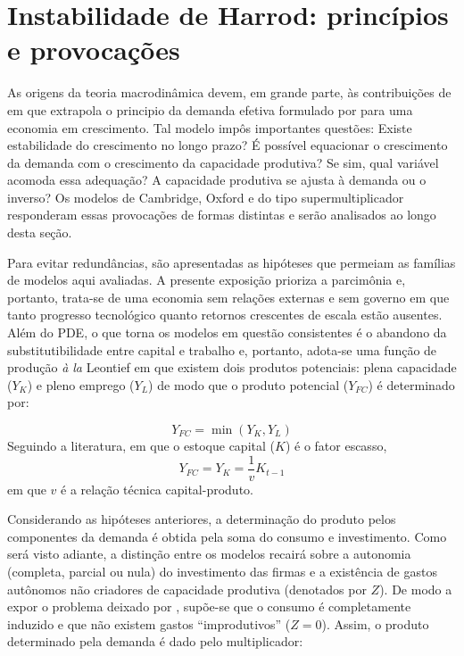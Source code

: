 
\section{Instabilidade de Harrod: princípios e provocações}\label{SecHarrod}

As origens da teoria macrodinâmica devem, em grande parte, às contribuições de \textcite{harrod_essay_1939} em que extrapola o principio da demanda efetiva formulado por \textcite{keynes_general_1936} para uma economia em crescimento. Tal modelo impôs importantes questões: Existe estabilidade do crescimento no longo pra\-zo? É possível equacionar o crescimento da demanda com o crescimento da capacidade produtiva? Se sim, qual variável acomoda essa adequação? A capacidade produtiva se ajusta à demanda ou o inverso? Os modelos de Cambridge, Oxford e do tipo supermultiplicador responderam essas provocações de formas distintas e serão analisados ao longo desta seção.

Para evitar redundâncias, são apresentadas as hipóteses que permeiam as famílias de modelos aqui avaliadas. 
A presente exposição prioriza a parcimônia e, portanto, trata-se de uma economia sem relações externas e sem governo em que tanto progresso tecnológico quanto retornos crescentes de escala estão ausentes. Além do PDE, o que torna os modelos em questão consistentes é o abandono da substitutibilidade entre capital e trabalho e, portanto, adota-se uma função de produção \textit{à la} Leontief em que existem dois produtos potenciais: plena capacidade ($Y_K$) e pleno emprego ($Y_L$) de modo que o produto potencial ($Y_{FC}$) é determinado por:

\begin{equation}
    Y_{FC} = \min (Y_K, Y_L)
\end{equation}
Seguindo a literatura, em que o estoque capital ($K$) é o fator escasso,
\begin{equation}
\label{Oferta}
    Y_{FC} = Y_K = \frac{1}{v}K_{t-1}
\end{equation}
em que $v$ é a relação técnica capital-produto. 


Considerando as hipóteses anteriores, a determinação do produto pelos componentes da demanda é obtida pela soma do consumo e investimento. Como será visto adiante, a distinção entre os modelos recairá sobre a autonomia (completa, parcial ou nula) do investimento das firmas e a existência de gastos autônomos não criadores de capacidade produtiva (denotados por $Z$). De modo a expor o problema deixado por \textcite{harrod_essay_1939}, supõe-se que o consumo é completamente induzido e que não existem gastos ``improdutivos'' ($Z=0$). Assim, o produto determinado pela demanda é dado pelo multiplicador:

